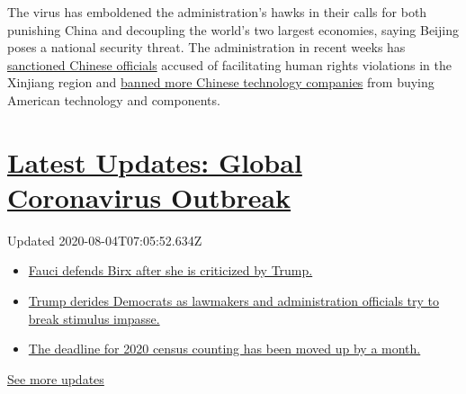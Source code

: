 The virus has emboldened the administration's hawks in their calls for
both punishing China and decoupling the world's two largest economies,
saying Beijing poses a national security threat. The administration in
recent weeks has
\href{https://www.nytimes3xbfgragh.onion/2020/07/31/us/politics/sanctions-china-xinjiang-uighurs.html}{sanctioned
Chinese officials} accused of facilitating human rights violations in
the Xinjiang region and
\href{https://www.nytimes3xbfgragh.onion/2020/07/20/business/economy/china-sanctions-uighurs-labor.html}{banned
more Chinese technology companies} from buying American technology and
components.

\hypertarget{latest-updates-global-coronavirus-outbreak}{%
\section{\texorpdfstring{\href{https://www.nytimes3xbfgragh.onion/2020/08/03/world/coronavirus-covid-19.html?action=click\&pgtype=Article\&state=default\&region=MAIN_CONTENT_1\&context=storylines_live_updates}{Latest
Updates: Global Coronavirus
Outbreak}}{Latest Updates: Global Coronavirus Outbreak}}\label{latest-updates-global-coronavirus-outbreak}}

Updated 2020-08-04T07:05:52.634Z

\begin{itemize}
\tightlist
\item
  \href{https://www.nytimes3xbfgragh.onion/2020/08/03/world/coronavirus-covid-19.html?action=click\&pgtype=Article\&state=default\&region=MAIN_CONTENT_1\&context=storylines_live_updates\#link-4547638f}{Fauci
  defends Birx after she is criticized by Trump.}
\item
  \href{https://www.nytimes3xbfgragh.onion/2020/08/03/world/coronavirus-covid-19.html?action=click\&pgtype=Article\&state=default\&region=MAIN_CONTENT_1\&context=storylines_live_updates\#link-15e7f995}{Trump
  derides Democrats as lawmakers and administration officials try to
  break stimulus impasse.}
\item
  \href{https://www.nytimes3xbfgragh.onion/2020/08/03/world/coronavirus-covid-19.html?action=click\&pgtype=Article\&state=default\&region=MAIN_CONTENT_1\&context=storylines_live_updates\#link-e5a2cda}{The
  deadline for 2020 census counting has been moved up by a month.}
\end{itemize}

\href{https://www.nytimes3xbfgragh.onion/2020/08/03/world/coronavirus-covid-19.html?action=click\&pgtype=Article\&state=default\&region=MAIN_CONTENT_1\&context=storylines_live_updates}{See
more updates}

